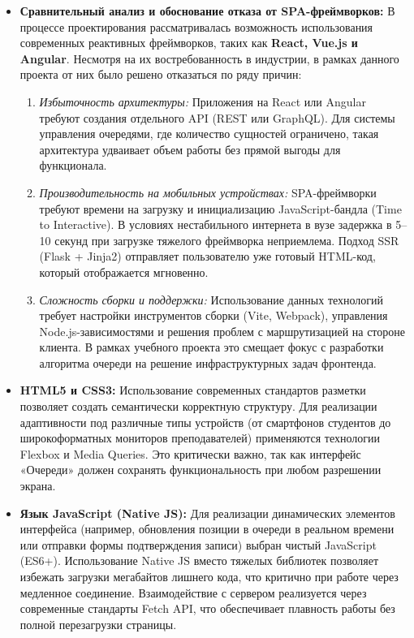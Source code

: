 \begin{itemize}
	\item \textbf{Сравнительный анализ и обоснование отказа от SPA-фреймворков:} 
В процессе проектирования рассматривалась возможность использования современных реактивных фреймворков, 
таких как \textbf{React, Vue.js и Angular}. Несмотря на их востребованность в индустрии, в рамках данного 
проекта от них было решено отказаться по ряду причин:

\begin{enumerate}
    \item \textit{Избыточность архитектуры:} Приложения на React или Angular требуют создания отдельного API 
	(REST или GraphQL). Для системы управления очередями, где количество сущностей ограничено, такая архитектура 
	удваивает объем работы без прямой выгоды для функционала.
    \item \textit{Производительность на мобильных устройствах:} SPA-фреймворки требуют времени на загрузку и 
	инициализацию JavaScript-бандла (Time to Interactive). В условиях нестабильного интернета в вузе задержка 
	в 5–10 секунд при загрузке тяжелого фреймворка неприемлема. Подход SSR (Flask + Jinja2) отправляет пользователю
	 уже готовый HTML-код, который отображается мгновенно.
    \item \textit{Сложность сборки и поддержки:} Использование данных технологий требует настройки инструментов 
	сборки (Vite, Webpack), управления Node.js-зависимостями и решения проблем с маршрутизацией на стороне клиента. В рамках учебного проекта это смещает фокус с разработки алгоритма очереди на решение инфраструктурных задач фронтенда.
\end{enumerate}

\item \textbf{HTML5 и CSS3:} Использование современных стандартов разметки позволяет создать семантически
 корректную структуру. Для реализации адаптивности под различные типы устройств (от смартфонов студентов до 
 широкоформатных мониторов преподавателей) применяются технологии Flexbox и Media Queries. Это критически важно, 
 так как интерфейс «Очереди» должен сохранять функциональность при любом разрешении экрана.

\item \textbf{Язык JavaScript (Native JS):} Для реализации динамических элементов интерфейса (например, 
обновления позиции в очереди в реальном времени или отправки формы подтверждения записи) выбран чистый 
JavaScript (ES6+). Использование Native JS вместо тяжелых библиотек позволяет избежать загрузки мегабайтов 
лишнего кода, что критично при работе через медленное соединение. Взаимодействие с сервером реализуется через 
современные стандарты Fetch API, что обеспечивает плавность работы без полной перезагрузки страницы.


\end{itemize}
